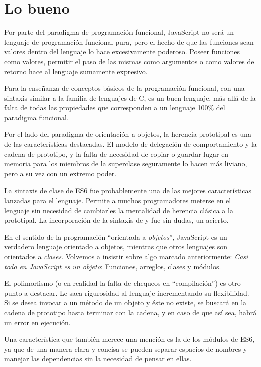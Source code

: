 \section*{Lo bueno}

Por parte del paradigma de programación funcional, JavaScript no será un lenguaje de programación funcional pura, pero el hecho de que las funciones sean valores dentro del lenguaje lo hace excesivamente poderoso. Poseer funciones como valores, permitir el paso de las mismas como argumentos o como valores de retorno hace al lenguaje sumamente expresivo.

Para la enseñanza de conceptos básicos de la programación funcional, con una sintaxis similar a la familia de lenguajes de C, es un buen lenguaje, más allá de la falta de todas las propiedades que corresponden a un lenguaje 100\% del paradigma funcional.

Por el lado del paradigma de orientación a objetos, la herencia prototipal es una de las características destacadas. El modelo de delegación de comportamiento y la cadena de prototipo, y la falta de necesidad de copiar o guardar lugar en memoria para los miembros de la superclase seguramente lo hacen más liviano, pero a su vez con un extremo poder.
 
La sintaxis de clase de ES6 fue probablemente una de las mejores características lanzadas para el lenguaje. Permite a muchos programadores meterse en el lenguaje sin necesidad de cambiarles la mentalidad de herencia clásica a la prototipal. La incorporación de la sintaxis de  y  fue sin dudas, un acierto.

En el sentido de la programación "`orientada a \textit{objetos}"', JavaScript es un verdadero lenguaje orientado a objetos, mientras que otros lenguajes son orientados a \textit{clases}. Volvemos a insistir sobre algo marcado anteriormente: \textit{Casi todo en JavaScript es un objeto}: Funciones, arreglos, clases y módulos.

El polimorfismo (o en realidad la falta de chequeos en "`compilación"') es otro punto a destacar. Le saca rigurosidad al lenguaje incrementando su flexibilidad. Si se desea invocar a un método de un objeto y éste no existe, se buscará en la cadena de prototipo hasta terminar con la cadena, y en caso de que así sea, habrá un error en ejecución.

Una característica que también merece una mención es la de los módulos de ES6, ya que de una manera clara y concisa se pueden separar espacios de nombres y manejar las dependencias sin la necesidad de pensar en ellas.
